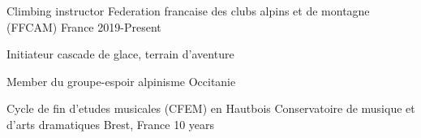 

\begin{cventries}

  \cventry
    {Climbing instructor} %
    {Federation francaise des clubs alpins et de montagne (FFCAM)} %
    {France} %
    {2019-Present} %
    {
      \begin{cvitems} %
        \item {Initiateur cascade de glace, terrain d'aventure}
        \item {Member du groupe-espoir alpinisme Occitanie}
      \end{cvitems}
    }

  \cventry
    {Cycle de fin d'etudes musicales (CFEM) en Hautbois} %
    {Conservatoire de musique et d'arts dramatiques} %
    {Brest, France} %
    {10 years} %
    { }
\end{cventries}
